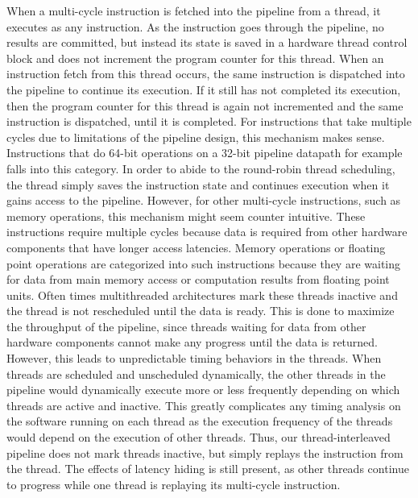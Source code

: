 When a multi-cycle instruction is fetched into the pipeline from a thread, it executes as any instruction.
As the instruction goes through the pipeline, no results are committed, but instead its state is saved in a hardware thread control block and does not increment the program counter for this thread. 
When an instruction fetch from this thread occurs, the same instruction is dispatched into the pipeline to continue its execution. 
If it still has not completed its execution, then the program counter for this thread is again not incremented and the same instruction is dispatched, until it is completed. 
For instructions that take multiple cycles due to limitations of the pipeline design, this mechanism makes sense.
Instructions that do 64-bit operations on a 32-bit pipeline datapath for example falls into this category. 
In order to abide to the round-robin thread scheduling, the thread simply saves the instruction state and continues execution when it gains access to the pipeline. 
However, for other multi-cycle instructions, such as memory operations, this mechanism might seem counter intuitive. 
These instructions require multiple cycles because data is required from other hardware components that have longer access latencies.
Memory operations or floating point operations are categorized into such instructions because they are waiting for data from main memory access or computation results from floating point units.
Often times multithreaded architectures mark these threads inactive and the thread is not rescheduled until the data is ready.
This is done to maximize the throughput of the pipeline, since threads waiting for data from other hardware components cannot make any progress until the data is returned. 
However, this leads to unpredictable timing behaviors in the threads.
When threads are scheduled and unscheduled dynamically, the other threads in the pipeline would dynamically execute more or less frequently depending on which threads are active and inactive.
This greatly complicates any timing analysis on the software running on each thread as the execution frequency of the threads would depend on the execution of other threads.
Thus, our thread-interleaved pipeline does not mark threads inactive, but simply replays the instruction from the thread.
The effects of latency hiding is still present, as other threads continue to progress while one thread is replaying its multi-cycle instruction.  

